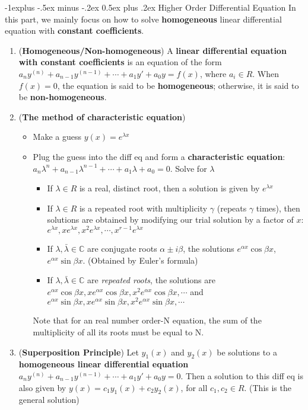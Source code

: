 \documentclass[10pt, landscape]{article}
\makeatletter
\renewcommand{\subsection}{\@startsection{subsection}{2}{0mm}%
                                {-1explus -.5ex minus -.2ex}%
                                {0.5ex plus .2ex}%
                                {\normalfont\normalsize\bfseries}}
\makeatother
\begin{document}
\begin{multicols}{4}
\subsection{Higher Order Differential Equation}
In this part, we mainly focus on how to solve \textbf{homogeneous} linear differential equation with \textbf{constant coefficients}.
\begin{enumerate}
    \item (\textbf{Homogeneous/Non-homogeneous}) A \textbf{linear differential equation with constant coefficients} is an equation of the form $a_ny^{(n)}+a_{n-1}y^{(n-1)}+\cdots+a_1y'+a_0y=f(x)$, where $a_i\in R$. When $f(x)=0$, the equation is said to be \textbf{homogeneous}; otherwise, it is said to be \textbf{non-homogeneous}.
    \item (\textbf{The method of characteristic equation})
    \begin{itemize}
        \item Make a guess $y(x)=e^{\lambda x}$
        \item Plug the guess into the diff eq and form a \textbf{characteristic equation}: $a_n\lambda^n+a_{n-1}\lambda^{n-1}+\cdots+a_1\lambda+a_0=0$. Solve for $\lambda$
        \begin{itemize}
            \item If $\lambda \in R$ is a real, distinct root, then a solution is given by $e^{\lambda x}$
            \item If $\lambda \in R$ is a repeated root with multiplicity $\gamma$ (repeats $\gamma$ times), then solutions are obtained by modifying our trial solution by a factor of $x$: $e^{\lambda x}, xe^{\lambda x}, x^2e^{\lambda x},\cdots, x^{r-1}e^{\lambda x}$
            \item If $\lambda, \bar \lambda \in \mathbb{C}$ are conjugate roots $\alpha \pm i\beta$, the solutions $e^{\alpha x}\cos \beta x$, $e^{\alpha x}\sin \beta x$. (Obtained by Euler's formula)
            \item If $\lambda, \bar \lambda \in \mathbb{C}$ are \textit{repeated roots}, the solutions are $e^{\alpha x}\cos \beta x, xe^{\alpha x}\cos \beta x, x^2e^{\alpha x}\cos \beta x, \cdots$ and $e^{\alpha x}\sin \beta x, xe^{\alpha x}\sin \beta x, x^2e^{\alpha x}\sin \beta x, \cdots$
        \end{itemize}
        Note that for an real number order-N equation, the sum of the multiplicity of all its roots must be equal to N.
    \end{itemize}
    \item (\textbf{Superposition Principle}) Let $y_1(x)$ and $y_2(x)$ be solutions to a \textbf{homogeneous linear differential equation} $a_ny^{(n)}+a_{n-1}y^{(n-1)}+\cdots+a_1y'+a_0y=0$. Then a solution to this diff eq is also given by $y(x)=c_1y_1(x)+c_2y_2(x)$, for all $c_1, c_2 \in R$. (This is the general solution)
\end{enumerate}


\end{multicols}
\end{document}
